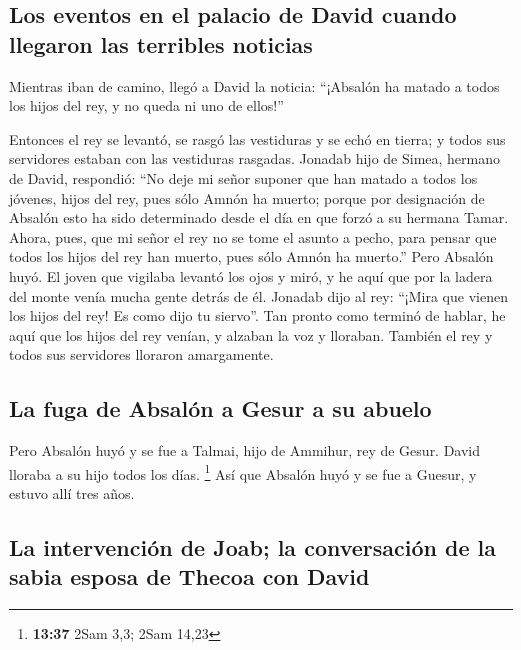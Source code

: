 \begin{paracol}{2}
\hypertarget{los-eventos-en-el-palacio-de-david-cuando-llegaron-las-terribles-noticias}{%
\subsection{Los eventos en el palacio de David cuando llegaron las
terribles
noticias}\label{los-eventos-en-el-palacio-de-david-cuando-llegaron-las-terribles-noticias}}

 Mientras iban de camino, llegó a David la noticia:
``¡Absalón ha matado a todos los hijos del rey, y no queda ni uno de
ellos!''

 Entonces el rey se levantó, se rasgó las vestiduras y se
echó en tierra; y todos sus servidores estaban con las vestiduras
rasgadas.  Jonadab hijo de Simea, hermano de David,
respondió: ``No deje mi señor suponer que han matado a todos los
jóvenes, hijos del rey, pues sólo Amnón ha muerto; porque por
designación de Absalón esto ha sido determinado desde el día en que
forzó a su hermana Tamar.  Ahora, pues, que mi señor el
rey no se tome el asunto a pecho, para pensar que todos los hijos del
rey han muerto, pues sólo Amnón ha muerto.''  Pero
Absalón huyó. El joven que vigilaba levantó los ojos y miró, y he aquí
que por la ladera del monte venía mucha gente detrás de él.
 Jonadab dijo al rey: ``¡Mira que vienen los hijos del
rey! Es como dijo tu siervo''.  Tan pronto como terminó
de hablar, he aquí que los hijos del rey venían, y alzaban la voz y
lloraban. También el rey y todos sus servidores lloraron amargamente.

\hypertarget{la-fuga-de-absaluxf3n-a-gesur-a-su-abuelo}{%
\subsection{La fuga de Absalón a Gesur a su
abuelo}\label{la-fuga-de-absaluxf3n-a-gesur-a-su-abuelo}}

 Pero Absalón huyó y se fue a Talmai, hijo de Ammihur,
rey de Gesur. David lloraba a su hijo todos los días. \footnote{\textbf{13:37}
  2Sam 3,3; 2Sam 14,23}  Así que Absalón huyó y se fue a
Guesur, y estuvo allí tres años.

\hypertarget{la-intervenciuxf3n-de-joab-la-conversaciuxf3n-de-la-sabia-esposa-de-thecoa-con-david}{%
\subsection{La intervención de Joab; la conversación de la sabia esposa
de Thecoa con
David}\label{la-intervenciuxf3n-de-joab-la-conversaciuxf3n-de-la-sabia-esposa-de-thecoa-con-david}}


\end{paracol}

